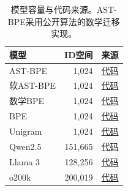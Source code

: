\begin{table}[t]\centering\small\caption{模型容量与代码来源。AST-BPE采用公开算法的数学迁移实现。}\label{tab:models}\begin{tabular}{lrr}\toprule 模型&ID空间&来源\\\midrule
AST-BPE & 1,024 & \href{https://github.com/SamuelGabriel/sqlbpe}{代码}\\
软AST-BPE & 1,024 & \href{https://github.com/xtr1976536/math-tokenizer-lab}{代码}\\
数学BPE & 1,024 & \href{https://github.com/huggingface/tokenizers}{代码}\\
BPE & 1,024 & \href{https://github.com/huggingface/tokenizers}{代码}\\
Unigram & 1,024 & \href{https://github.com/google/sentencepiece}{代码}\\
Qwen2.5 & 151,665 & \href{https://huggingface.co/Qwen/Qwen2.5-0.5B/blob/main/tokenizer.json}{代码}\\
Llama 3 & 128,256 & \href{https://github.com/meta-llama/llama3/blob/main/llama/tokenizer.py}{代码}\\
o200k & 200,019 & \href{https://github.com/openai/tiktoken}{代码}\\
\bottomrule\end{tabular}\end{table}
